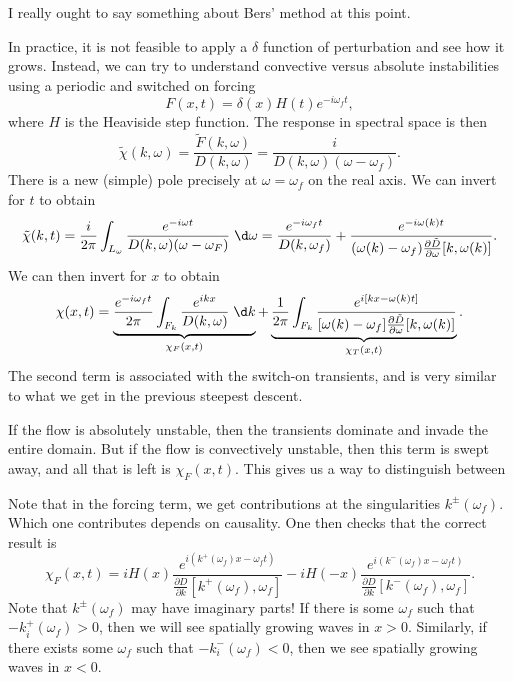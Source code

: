 \documentclass[a4paper]{article}
\begin{document}
I really ought to say something about Bers' method at this point.

%
%
%

In practice, it is not feasible to apply a $\delta$ function of perturbation and see how it grows. Instead, we can try to understand convective versus absolute instabilities using a periodic and switched on forcing
\[
  F(x, t) = \delta(x) H(t) e^{-i\omega_f t},
\]
where $H$ is the Heaviside step function. The response in spectral space is then
\[
  \tilde{\chi}(k, \omega) = \frac{\tilde{F}(k, \omega)}{D(k, \omega)} = \frac{i}{D(k, \omega)(\omega - \omega_f)}.
\]
There is a new (simple) pole precisely at $\omega = \omega_f$ on the real axis. We can invert for $t$ to obtain
\[
  \tilde{\chi}(k, t) = \frac{i}{2\pi} \int_{L_\omega} \frac{e^{-i\omega t}}{D(k, \omega) (\omega - \omega_F)}\;\d \omega = \frac{e^{-i\omega_f t}}{D(k, \omega_f)} + \frac{e^{-i\omega(k) t}}{(\omega(k) - \omega_f) \frac{\partial \tilde{D}}{\partial \omega}[k, \omega(k)]}.
\]
We can then invert for $x$ to obtain
\[
  \chi(x, t) = \underbrace{\frac{e^{-i\omega_f t}}{2\pi} \int_{F_k} \frac{e^{ikx}}{D(k, \omega)}\;\d k}_{\chi_F(x, t)} + \underbrace{\frac{1}{2\pi} \int_{F_k} \frac{e^{i[kx - \omega(k) t]}}{[\omega(k) - \omega_f] \frac{\partial \tilde{D}}{\partial \omega} [k, \omega(k)]}}_{\chi_T(x, t)}.
\]
The second term is associated with the switch-on transients, and is very similar to what we get in the previous steepest descent.

If the flow is absolutely unstable, then the transients dominate and invade the entire domain. But if the flow is convectively unstable, then this term is swept away, and all that is left is $\chi_F(x, t)$. This gives us a way to distinguish between 

Note that in the forcing term, we get contributions at the singularities $k^{\pm}(\omega_f)$. Which one contributes depends on causality. One then checks that the correct result is
\[
  \chi_F(x, t) = iH(x) \frac{e^{i(k^+(\omega_f)x - \omega_f t)}}{\frac{\partial D}{\partial k} [k^+(\omega_f), \omega_f]} - i H(-x) \frac{e^{i(k^-(\omega_f) x - \omega_f t)}}{\frac{\partial D}{\partial k} [k^-(\omega_f), \omega_f]}.
\]
Note that $k^{\pm}(\omega_f)$ may have imaginary parts! If there is some $\omega_f$ such that $-k_i^+(\omega_f) > 0$, then we will see spatially growing waves in $x > 0$. Similarly, if there exists some $\omega_f$ such that $-k_i^-(\omega_f) < 0$, then we see spatially growing waves in $x < 0$.
\end{document}
